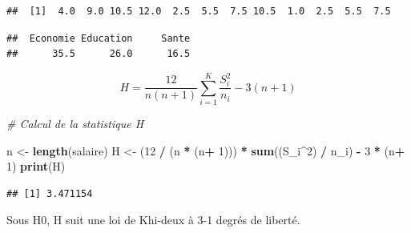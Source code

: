 \documentclass[
  12pt,
]{article}
\newenvironment{Shaded}{\begin{snugshade}}{\end{snugshade}}
\newcommand{\CommentTok}[1]{\textcolor[rgb]{0.56,0.35,0.01}{\textit{#1}}}
\newcommand{\DecValTok}[1]{\textcolor[rgb]{0.00,0.00,0.81}{#1}}
\newcommand{\FunctionTok}[1]{\textcolor[rgb]{0.13,0.29,0.53}{\textbf{#1}}}
\newcommand{\NormalTok}[1]{#1}
\newcommand{\OtherTok}[1]{\textcolor[rgb]{0.56,0.35,0.01}{#1}}
\newcommand{\SpecialCharTok}[1]{\textcolor[rgb]{0.81,0.36,0.00}{\textbf{#1}}}
\begin{document}
\begin{verbatim}
##  [1]  4.0  9.0 10.5 12.0  2.5  5.5  7.5 10.5  1.0  2.5  5.5  7.5
\end{verbatim}

\begin{Shaded}
\end{Shaded}

\begin{verbatim}
##  Economie Education     Sante 
##      35.5      26.0      16.5
\end{verbatim}

\[ H = \dfrac{12}{n (n+1)} \sum_{i = 1}^{K} \dfrac{S_i^2}{n_i} - 3 (n+1) \]

\begin{Shaded}
\begin{Highlighting}[]
\CommentTok{\# Calcul de la statistique H }

\NormalTok{n }\OtherTok{\textless{}{-}} \FunctionTok{length}\NormalTok{(salaire)}
\NormalTok{H }\OtherTok{\textless{}{-}}\NormalTok{ (}\DecValTok{12} \SpecialCharTok{/}\NormalTok{ (n }\SpecialCharTok{*}\NormalTok{ (n}\SpecialCharTok{+} \DecValTok{1}\NormalTok{))) }\SpecialCharTok{*} \FunctionTok{sum}\NormalTok{((S\_i}\SpecialCharTok{\^{}}\DecValTok{2}\NormalTok{) }\SpecialCharTok{/}\NormalTok{ n\_i) }\SpecialCharTok{{-}} \DecValTok{3} \SpecialCharTok{*}\NormalTok{ (n}\SpecialCharTok{+} \DecValTok{1}\NormalTok{)}
\FunctionTok{print}\NormalTok{(H)}
\end{Highlighting}
\end{Shaded}

\begin{verbatim}
## [1] 3.471154
\end{verbatim}

Sous H0, H suit une loi de Khi-deux à 3-1 degrés de liberté.
\end{document}

